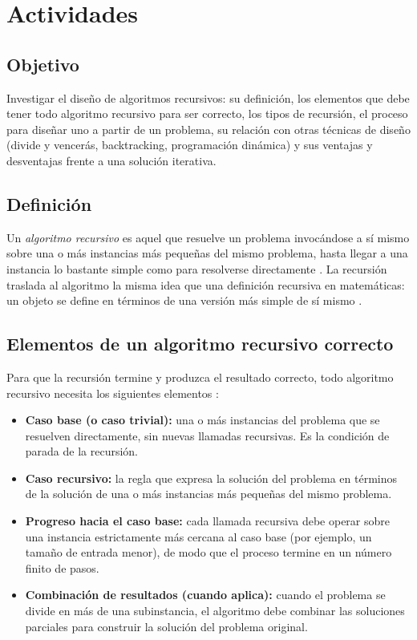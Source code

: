 \documentclass{article}
\begin{document}
    \section{Actividades}
 
\subsection{Objetivo}
 
Investigar el diseño de algoritmos recursivos: su definición, los elementos
que debe tener todo algoritmo recursivo para ser correcto, los tipos de
recursión, el proceso para diseñar uno a partir de un problema, su relación
con otras técnicas de diseño (divide y vencerás, backtracking, programación
dinámica) y sus ventajas y desventajas frente a una solución iterativa.
 
\subsection{Definición}
 
Un \textit{algoritmo recursivo} es aquel que resuelve un problema invocándose
a sí mismo sobre una o más instancias más pequeñas del mismo problema, hasta
llegar a una instancia lo bastante simple como para resolverse directamente
\citep{clrs}. La recursión traslada al algoritmo la misma idea que una
definición recursiva en matemáticas: un objeto se define en términos de una
versión más simple de sí mismo \citep{wirth1976}.
 
\subsection{Elementos de un algoritmo recursivo correcto}
 
Para que la recursión termine y produzca el resultado correcto, todo
algoritmo recursivo necesita los siguientes elementos \citep{levitin2012}:
 
\begin{itemize}
  \item \textbf{Caso base (o caso trivial):} una o más instancias del
        problema que se resuelven directamente, sin nuevas llamadas
        recursivas. Es la condición de parada de la recursión.
  \item \textbf{Caso recursivo:} la regla que expresa la solución del
        problema en términos de la solución de una o más instancias más
        pequeñas del mismo problema.
  \item \textbf{Progreso hacia el caso base:} cada llamada recursiva debe
        operar sobre una instancia estrictamente más cercana al caso base
        (por ejemplo, un tamaño de entrada menor), de modo que el proceso
        termine en un número finito de pasos.
  \item \textbf{Combinación de resultados (cuando aplica):} cuando el
        problema se divide en más de una subinstancia, el algoritmo debe
        combinar las soluciones parciales para construir la solución del
        problema original.
\end{itemize}
 
\end{document}
